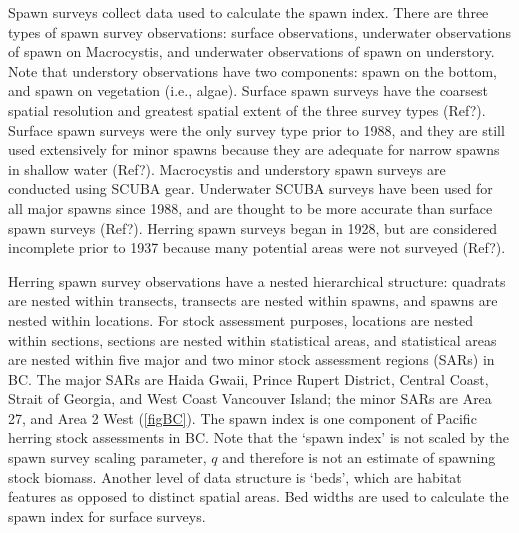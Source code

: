 \documentclass[12pt]{article}
\begin{document}
Spawn surveys collect data used to calculate the spawn index.
There are three types of spawn survey observations: surface observations, underwater observations of spawn on Macrocystis, and underwater observations of spawn on understory.
Note that understory observations have two components: spawn on the bottom, and spawn on vegetation (i.e., algae).
Surface spawn surveys have the coarsest spatial resolution and greatest spatial extent of the three survey types (Ref?).
Surface spawn surveys were the only survey type prior to 1988, and they are still used extensively for minor spawns because they are adequate for narrow spawns in shallow water (Ref?).
Macrocystis and understory spawn surveys are conducted using SCUBA gear.
Underwater SCUBA surveys have been used for all major spawns since 1988, and are thought to be more accurate than surface spawn surveys (Ref?).
Herring spawn surveys began in 1928, but are considered incomplete prior to 1937 because many potential areas were not surveyed (Ref?).

Herring spawn survey observations have a nested hierarchical structure: quadrats are nested within transects, transects are nested within spawns, and spawns are nested within locations.
For stock assessment purposes, locations are nested within sections, sections are nested within statistical areas, and statistical areas are nested within five major and two minor stock assessment regions (SARs) in BC.
The major SARs are Haida Gwaii, Prince Rupert District, Central Coast, Strait of Georgia, and West Coast Vancouver Island; the minor SARs are Area 27, and Area 2 West (\autoref{figBC}).
The spawn index is one component of Pacific herring stock assessments in BC.
Note that the `spawn index' is not scaled by the spawn survey scaling parameter, $q$ \citeyearpar[CSAS][]{CSAS2015b} and therefore is not an estimate of spawning stock biomass.
Another level of data structure is `beds', which are habitat features as opposed to distinct spatial areas.
Bed widths are used to calculate the spawn index for surface surveys.
\end{document}
